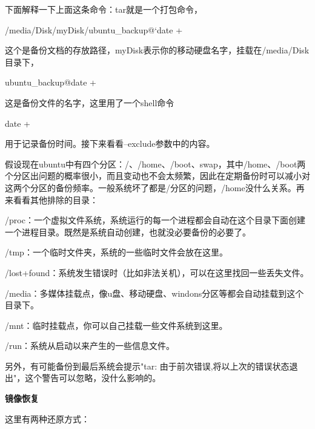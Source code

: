 下面解释一下上面这条命令：tar就是一个打包命令，

\begin{tcode}
	/media/Disk/myDisk/ubuntu_backup@`date +%
\end{tcode}

这个是备份文档的存放路径，myDisk表示你的移动硬盘名字，挂载在/media/Disk目录下，

\begin{tcode}
	ubuntu_backup@date +%
\end{tcode}

这是备份文件的名字，这里用了一个shell命令

\begin{tcode}
	date +%
\end{tcode}

用于记录备份时间。接下来看看–exclude参数中的内容。

假设现在ubuntu中有四个分区：/、/home、/boot、swap，其中/home、/boot两个分区出问题的概率很小，而且变动也不会太频繁，因此在定期备份时可以减小对这两个分区的备份频率。一般系统坏了都是/分区的问题，/home没什么关系。再来看看其他排除的目录：

/proc：一个虚拟文件系统，系统运行的每一个进程都会自动在这个目录下面创建一个进程目录。既然是系统自动创建，也就没必要备份的必要了。

/tmp：一个临时文件夹，系统的一些临时文件会放在这里。

/lost+found：系统发生错误时（比如非法关机），可以在这里找回一些丢失文件。

/media：多媒体挂载点，像u盘、移动硬盘、windons分区等都会自动挂载到这个目录下。

/mnt：临时挂载点，你可以自己挂载一些文件系统到这里。

/run：系统从启动以来产生的一些信息文件。

另外，有可能备份到最后系统会提示"tar: 由于前次错误,将以上次的错误状态退出"，这个警告可以忽略，没什么影响的。

\textbf{镜像恢复}

这里有两种还原方式：


